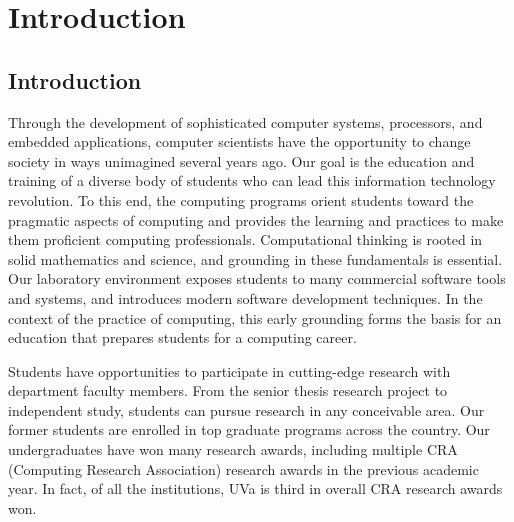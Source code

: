 \documentclass[10pt,letter]{book}
\newcommand{\mychapter}[2]{\chapter{#1}\renewcommand{\leftmark}{\textsc{#2}}}
\newcommand{\mysection}[1]{\section{#1}\renewcommand{\rightmark}{#1}}
\begin{document}
\clearpage
\pagestyle{fancy}
\setcounter{page}{1}

\tableofcontents

\cleardoublepage
\setcounter{page}{1}

\mychapter{Introduction}{Introduction}

\mysection{Introduction}

Through the development of sophisticated computer systems, processors,
and embedded applications, computer scientists have the opportunity to
change society in ways unimagined several years ago. Our goal is the
education and training of a diverse body of students who can lead this
information technology revolution. To this end, the computing programs
orient students toward the pragmatic aspects of computing and provides
the learning and practices to make them proficient computing
professionals. Computational thinking is rooted in solid mathematics
and science, and grounding in these fundamentals is essential. Our
laboratory environment exposes students to many commercial software
tools and systems, and introduces modern software development
techniques.  In the context of the practice of computing, this early
grounding forms the basis for an education that prepares students for
a computing career.




Students have opportunities to participate in cutting-edge research
with department faculty members. From the senior thesis research
project to independent study, students can pursue research in any
conceivable area. Our former students are enrolled in top graduate
programs across the country. Our undergraduates have won many research
awards, including multiple CRA (Computing Research Association)
research awards in the previous academic year. In fact, of all the
institutions, UVa is third in overall CRA research awards won.
\end{document}
